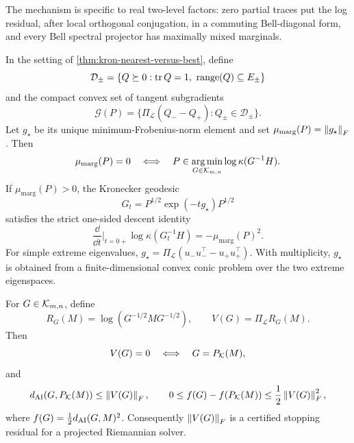 The mechanism is specific to real two-level factors: zero partial traces put
the log residual, after local orthogonal conjugation, in a commuting
Bell-diagonal form, and every Bell spectral projector has maximally mixed
marginals.

\begin{corollary}
\label{cor:kron-marginal-mismatch}
In the setting of \cref{thm:kron-nearest-versus-best}, define
\[
  \mathcal D_\pm
  =
  \{Q\succeq0:\operatorname{tr} Q=1,\ \operatorname{range}(Q)\subseteq E_\pm\}
\]
and the compact convex set of tangent subgradients
\[
  \mathcal G(P)
  =
  \{\Pi_{\mathcal L}(Q_--Q_+):Q_\pm\in\mathcal D_\pm\}.
\]
Let \(g_\star\) be its unique minimum-Frobenius-norm element and set
\(\mu_{\mathrm{marg}}(P)=\left\lVert g_\star\right\rVert_F\).  Then
\[
  \mu_{\mathrm{marg}}(P)=0
  \quad\Longleftrightarrow\quad
  P\in\operatorname*{arg\,min}_{G\in\mathcal K_{m,n}}\log\kappa(G^{-1}H).
\]
If \(\mu_{\mathrm{marg}}(P)>0\), the Kronecker geodesic
\[
  G_t=P^{1/2}\exp(-t g_\star)P^{1/2}
\]
satisfies the strict one-sided descent identity
\[
  \frac{\dd}{\dd t}\bigg|_{t=0+}
  \log\kappa(G_t^{-1}H)
  =-\mu_{\mathrm{marg}}(P)^2.
\]
For simple extreme eigenvalues,
\(g_\star=\Pi_{\mathcal L}(u_-u_-^\top-u_+u_+^\top)\).  With multiplicity,
\(g_\star\) is obtained from a finite-dimensional convex conic problem over
the two extreme eigenspaces.
\end{corollary}

\begin{corollary}
\label{cor:kron-residual-certificate}
For \(G\in\mathcal K_{m,n}\), define
\[
  R_G(M)=\log(G^{-1/2}MG^{-1/2}),
  \qquad
  V(G)=\Pi_{\mathcal L}R_G(M).
\]
Then
\[
  V(G)=0\quad\Longleftrightarrow\quad G=P_{\mathcal K}(M),
\]
and
\[
  d_{\mathrm{AI}}(G,P_{\mathcal K}(M))\le\left\lVert V(G)\right\rVert_F,\qquad
  0\le f(G)-f(P_{\mathcal K}(M))\le\frac12\left\lVert V(G)\right\rVert_F^2,
\]
where \(f(G)=\frac12d_{\mathrm{AI}}(G,M)^2\). Consequently \(\left\lVert V(G)\right\rVert_F\) is a
certified stopping residual for a projected Riemannian solver.
\end{corollary}

